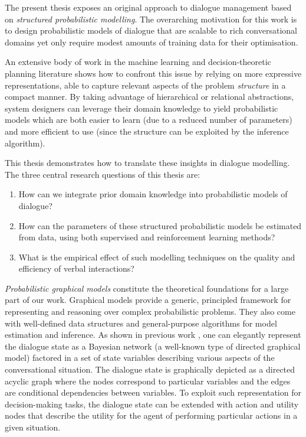 The present thesis exposes an original approach to dialogue management based on \textit{structured probabilistic modelling}.  The overarching motivation for this work is to design probabilistic models of dialogue that are scalable to rich conversational domains yet only require modest amounts of training data for their optimisation.

An extensive body of work in the machine learning and decision-theoretic planning literature shows how to confront this issue by relying on more expressive representations, able to capture relevant aspects of the problem \textit{structure} in a compact manner. By taking advantage of hierarchical or relational abstractions, system designers can leverage their domain knowledge to yield probabilistic models which are both easier to learn (due to a reduced number of parameters) and more efficient to use (since the structure can be exploited by the inference algorithm).  

This thesis demonstrates how to translate these insights in dialogue modelling.  The three central research questions of this thesis are:
\begin{enumerate}
\item How can we integrate prior domain knowledge into probabilistic models of dialogue?
\item How can the parameters of these structured probabilistic models be estimated from data, using both supervised and reinforcement learning methods?  
\item What is the empirical effect of such modelling techniques on the quality and efficiency of verbal interactions?
\end{enumerate}

\textit{Probabilistic graphical models} \citep{Koller+Friedman:09} constitute the theoretical foundations for a large part of our work.  Graphical models provide a generic, principled framework for representing and reasoning over complex probabilistic problems. They also come with well-defined data structures and general-purpose algorithms for model estimation and inference.  As shown in previous work \citep[see for instance ][]{Thomson:2010:BUD:1772996.1773040}, one can elegantly represent the dialogue state as a Bayesian network (a well-known type of directed graphical model) factored in a set of state variables describing various aspects of the conversational situation.  The dialogue state is graphically depicted as a directed acyclic graph where the nodes correspond to particular variables and the edges are conditional dependencies between variables. To exploit such representation for decision-making tasks, the dialogue state can be extended with action and utility nodes that describe the utility for the agent of performing particular actions in a given situation. 

